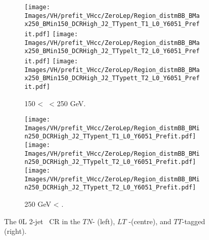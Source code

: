 \vspace*{\fill} 

\begin{figure}[h!]
    \centering
    \begin{subfigure}[b]{\textwidth}
        \centering
        \texttt{[image: Images/VH/prefit\_VHcc/ZeroLep/Region\_distmBB\_BMax250\_BMin150\_DCRHigh\_J2\_TTypent\_T1\_L0\_Y6051\_Prefit.pdf]}
        \texttt{[image: Images/VH/prefit\_VHcc/ZeroLep/Region\_distmBB\_BMax250\_BMin150\_DCRHigh\_J2\_TTypelt\_T2\_L0\_Y6051\_Prefit.pdf]}
        \texttt{[image: Images/VH/prefit\_VHcc/ZeroLep/Region\_distmBB\_BMax250\_BMin150\_DCRHigh\_J2\_TTypett\_T2\_L0\_Y6051\_Prefit.pdf]}
        \caption{150 < \ptv\ < 250 GeV.}
        \label{fig:plots_VHcc_OL_150_CRH_2c_2J}
    \end{subfigure}
    \begin{subfigure}[b]{\textwidth}
        \centering
        \texttt{[image: Images/VH/prefit\_VHcc/ZeroLep/Region\_distmBB\_BMin250\_DCRHigh\_J2\_TTypent\_T1\_L0\_Y6051\_Prefit.pdf]}
        \texttt{[image: Images/VH/prefit\_VHcc/ZeroLep/Region\_distmBB\_BMin250\_DCRHigh\_J2\_TTypelt\_T2\_L0\_Y6051\_Prefit.pdf]}
        \texttt{[image: Images/VH/prefit\_VHcc/ZeroLep/Region\_distmBB\_BMin250\_DCRHigh\_J2\_TTypett\_T2\_L0\_Y6051\_Prefit.pdf]}
        \caption{250 GeV < \ptv.}
        \label{fig:plots_VHcc_OL_250_CRH_2c_2J}
    \end{subfigure}
    \caption{The 0L 2-jet \highdr\ CR in the $TN$- (left), $LT$ -(centre), and $TT$-tagged (right).}
    \label{fig:plots_VHcc_OL_CRH_2c_2J}
\end{figure} 
